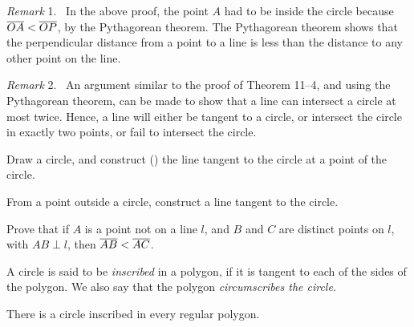 \documentclass[11pt]{book}
\theoremstyle{XIplainnote}
\theoremstyle{bkplain}
\newenvironment{XIremarkn}[1]{\par\medskip\noindent\emph{Remark} #1.\ }%
  {\par\medskip}
\begin{document}
\begin{XIremarkn}{1}
In the above proof, the point $A$ had to be inside the circle because
$\overline{OA} < \overline{OP}$, by the Pythagorean theorem. The Pythagorean theorem shows
that the perpendicular distance from a point to a line is less than the
distance to any other point on the line.
\end{XIremarkn}

\begin{XIremarkn}{2}
An argument similar to the proof of Theorem 11--4, and using the Pythagorean
theorem, can be made to show that a line can intersect a circle at most twice.
Hence, a line will either be tangent to a circle, or intersect the circle in
exactly two points, or fail to intersect the circle.
\end{XIremarkn}

\begin{exercisecols}
\begin{exlist}
\item Draw a circle, and construct (\RC) the line tangent to the circle at a
      point of the circle.
\item[\stex 2.] From a point outside a circle, construct a line tangent to the
      circle.
\item[3.] Prove that if $A$ is a point not on a line $l$, and $B$ and $C$ are
      distinct points on $l$, with $AB \perp l$, then $\overline{AB} < \overline{AC}$.
\end{exlist}
\end{exercisecols}

\begin{definition}
A circle is said to be \emph{inscribed} in a polygon, if it is tangent to each
of the sides of the polygon. We also say that the polygon \emph{circumscribes
the circle}.
\end{definition}

\begin{theorem}
There is a circle inscribed in every regular polygon.
\end{theorem}

\begin{steps}
\end{steps}
\end{document}

